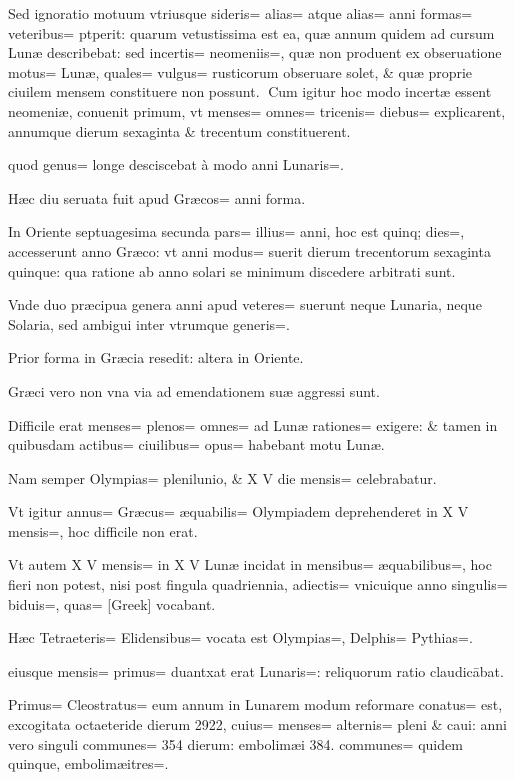 \begin{parnumbers}

Sed ignoratio motuum vtriusque sideris= alias= atque alias= anni formas= veteribus=  ptperit: quarum vetustissima est ea, quæ annum quidem ad cursum Lunæ describebat: sed incertis= neomeniis=, quæ non produent ex obseruatione motus= Lunæ, quales= vulgus= rusticorum obseruare solet, \& quæ proprie ciuilem mensem constituere non possunt.
Cum igitur hoc modo incertæ essent neomeniæ, conuenit primum, vt menses= omnes= tricenis= diebus= explicarent, annumque dierum sexaginta \& trecentum constituerent.

quod genus= longe desciscebat à modo anni Lunaris=.

Hæc diu seruata fuit apud Græcos= anni forma.

In Oriente septuagesima secunda pars= illius= anni, hoc est quinq; dies=, accesserunt anno Græco: vt anni modus= suerit dierum trecentorum sexaginta quinque:  qua ratione ab anno solari se minimum discedere arbitrati sunt.

Vnde duo præcipua genera anni apud veteres= suerunt neque Lunaria, neque Solaria, sed ambigui inter vtrumque generis=.

Prior forma in Græcia resedit: altera in Oriente.

Græci vero non vna via ad emendationem suæ aggressi sunt.

Difficile erat menses= plenos= omnes= ad Lunæ rationes= exigere: \& tamen in quibusdam actibus= ciuilibus= opus= habebant motu Lunæ.

Nam semper Olympias= plenilunio, \& X V die mensis= celebrabatur.

Vt igitur annus= Græcus= æquabilis= Olympiadem deprehenderet in X V mensis=, hoc difficile non erat.

Vt autem X V mensis= in X V Lunæ incidat in mensibus= æquabilibus=, hoc fieri non potest, nisi post fingula quadriennia, adiectis= vnicuique anno singulis=  biduis=, quas= [Greek] vocabant.

Hæc Tetraeteris= Elidensibus= vocata est Olympias=, Delphis= Pythias=.

eiusque mensis= primus= duantxat erat Lunaris=: reliquorum ratio claudicābat.

Primus= Cleostratus= eum annum in Lunarem modum reformare conatus= est, excogitata octaeteride dierum 2922, cuius= menses= alternis= pleni \& caui: anni vero singuli communes= 354 dierum: embolimæi 384. communes= quidem quinque, embolimæitres=.


\end{parnumbers}
